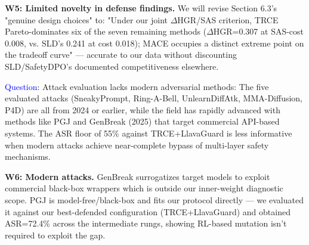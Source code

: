 \textbf{W5: Limited novelty in defense findings.} We will revise Section 6.3's "genuine design choices" to: "Under our joint $\Delta$HGR/SAS criterion, TRCE Pareto-dominates six of the seven remaining methods ($\Delta$HGR=0.307 at SAS-cost 0.008, vs. SLD's 0.241 at cost 0.018); MACE occupies a distinct extreme point on the tradeoff curve" — accurate to our data without discounting SLD/SafetyDPO's documented competitiveness elsewhere.




\textcolor{blue}{Question}: Attack evaluation lacks modern adversarial methods: The five evaluated attacks (SneakyPrompt, Ring-A-Bell, UnlearnDiffAtk, MMA-Diffusion, P4D) are all from 2024 or earlier, while the field has rapidly advanced with methods like PGJ and GenBreak (2025) that target commercial API-based systems. The ASR floor of 55\% against TRCE+LlavaGuard is less informative when modern attacks achieve near-complete bypass of multi-layer safety mechanisms.


\textbf{W6: Modern attacks.} GenBreak surrogatizes target models to exploit commercial black-box wrappers which is outside our inner-weight diagnostic scope. PGJ is model-free/black-box and fits our protocol directly — we evaluated it against our best-defended configuration (TRCE+LlavaGuard) and obtained ASR=72.4\% across the intermediate rungs, showing RL-based mutation isn't required to exploit the gap.




